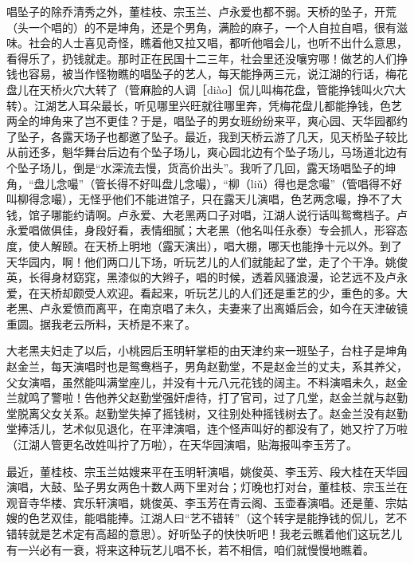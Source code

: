 \documentclass[12pt,UTF8]{ctexbook}
\begin{document}
唱坠子的除乔清秀之外，董桂枝、宗玉兰、卢永爱也都不弱。天桥的坠子，开荒（头一个唱的）的不是坤角，还是个男角，满脸的麻子，一个人自拉自唱，很有滋味。社会的人士喜见奇怪，瞧着他又拉又唱，都听他唱会儿，也听不出什么意思，看得乐了，扔钱就走。那时正在民国十二三年，社会里还没嚷穷哪！做艺的人们挣钱也容易，被当作怪物瞧的唱坠子的艺人，每天能挣两三元，说江湖的行话，梅花盘儿在天桥火穴大转了（管麻脸的人调［diào］侃儿叫梅花盘，管能挣钱叫火穴大转）。江湖艺人耳朵最长，听见哪里兴旺就往哪里奔，凭梅花盘儿都能挣钱，色艺两全的坤角来了岂不更佳？于是，唱坠子的男女班纷纷来平，爽心园、天华园都约了坠子，各露天场子也都邀了坠子。最近，我到天桥云游了几天，见天桥坠子较比从前还多，魁华舞台后边有个坠子场儿，爽心园北边有个坠子场儿，马场道北边有个坠子场儿，倒是“水深流去慢，货高价出头”。我听了几回，露天场唱坠子的坤角，“盘儿念嘬”（管长得不好叫盘儿念嘬），“柳（liǔ）得也是念嘬”（管唱得不好叫柳得念嘬），无怪乎他们不能进馆子，只在露天儿演唱，色艺两念嘬，挣不了大钱，馆子哪能约请啊。卢永爱、大老黑两口子对唱，江湖人说行话叫鸳鸯档子。卢永爱唱做俱佳，身段好看，表情细腻；大老黑（他名叫任永泰）专会抓人，形容态度，使人解颐。在天桥上明地（露天演出），唱大棚，哪天也能挣十元以外。到了天华园内，啊！他们两口儿下场，听玩艺儿的人们就能起了堂，走了个干净。姚俊英，长得身材窈窕，黑漆似的大辫子，唱的时候，透着风骚浪漫，论艺远不及卢永爱，在天桥却颇受人欢迎。看起来，听玩艺儿的人们还是重艺的少，重色的多。大老黑、卢永爱愤而离平，在南京唱了未久，夫妻来了出离婚后会，如今在天津破镜重圆。据我老云所料，天桥是不来了。

大老黑夫妇走了以后，小桃园后玉明轩掌柜的由天津约来一班坠子，台柱子是坤角赵金兰，每天演唱时也是鸳鸯档子，男角赵勤堂，不是赵金兰的丈夫，系其养父，父女演唱，虽然能叫满堂座儿，并没有十元八元花钱的阔主。不料演唱未久，赵金兰就鸣了警啦！告他养父赵勤堂强奸虐待，打了官司，过了几堂，赵金兰就与赵勤堂脱离父女关系。赵勤堂失掉了摇钱树，又往别处种摇钱树去了。赵金兰没有赵勤堂捧活儿，艺术似见退化，在平津演唱，连个怪声叫好的都没有了，她又拧了万啦（江湖人管更名改姓叫拧了万啦），在天华园演唱，贴海报叫李玉芳了。

最近，董桂枝、宗玉兰姑嫂来平在玉明轩演唱，姚俊英、李玉芳、段大桂在天华园演唱，大鼓、坠子男女两色十数人两下里对台；灯晚也打对台，董桂枝、宗玉兰在观音寺华楼、宾乐轩演唱，姚俊英、李玉芳在青云阁、玉壶春演唱。还是董、宗姑嫂的色艺双佳，能唱能捧。江湖人曰“艺不错转”（这个转字是能挣钱的侃儿，艺不错转就是艺术定有高超的意思）。好听坠子的快快听吧！我老云瞧着他们这玩艺儿有一兴必有一衰，将来这种玩艺儿唱不长，若不相信，咱们就慢慢地瞧着。
\end{document}
